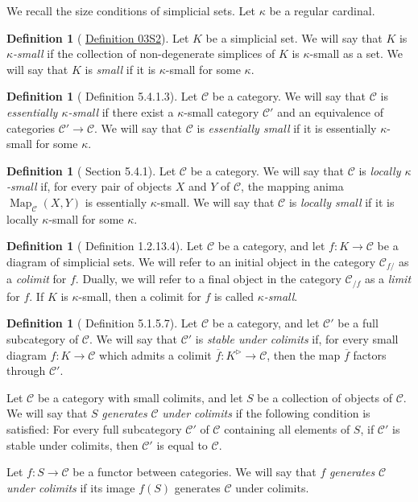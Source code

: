 \documentclass[a4paper,dvipdfmx,11pt,reqno]{amsart}
\DeclareMathOperator{\Map}{Map}
\newcommand{\C}{\mathcal{C}}
\theoremstyle{definition}
\newtheorem{definition}[theorem]{Definition}
\begin{document}
We recall the size conditions of simplicial sets.
Let $\kappa$ be a regular cardinal.

\begin{definition}[\cite{kerodon} \href{https://kerodon.net/tag/03S2}{Definition 03S2}]
  Let $K$ be a simplicial set.
  We will say that $K$ is \textit{$\kappa$-small} if the collection of non-degenerate simplices of $K$ is $\kappa$-small as a set.
  We will say that $K$ is \textit{small} if it is $\kappa$-small for some $\kappa$.
\end{definition}

\begin{definition}[\cite{HTT} Definition 5.4.1.3]
  Let $\C$ be a category.
  We will say that $\C$ is \textit{essentially $\kappa$-small} if there exist a $\kappa$-small category $\C'$ and an equivalence of categories $\C' \to \C$.
  We will say that $\C$ is \textit{essentially small} if it is essentially $\kappa$-small for some $\kappa$.
\end{definition}

\begin{definition}[\cite{HTT} Section 5.4.1]
  Let $\C$ be a category.
  We will say that $\C$ is \textit{locally $\kappa$-small} if, for every pair of objects $X$ and $Y$ of $\C$, the mapping anima $\Map_{\C}(X,Y)$ is essentially $\kappa$-small.
  We will say that $\C$ is \textit{locally small} if it is locally $\kappa$-small for some $\kappa$.
\end{definition}

\begin{definition}[\cite{HTT} Definition 1.2.13.4]
  Let $\C$ be a category, and let $f : K \to \C$ be a diagram of simplicial sets.
  We will refer to an initial object in the category $\C_{f/}$ as a \textit{colimit} for $f$.
  Dually, we will refer to a final object in the category $\C_{/f}$ as a \textit{limit} for $f$.
  If $K$ is $\kappa$-small, then a colimit for $f$ is called \textit{$\kappa$-small}.
\end{definition}

\begin{definition}[\cite{HTT} Definition 5.1.5.7]
  Let $\C$ be a category, and let $\C'$ be a full subcategory of $\C$.
  We will say that $\C'$ is \textit{stable under colimits} if, for every small diagram $f : K \to \C$ which admits a colimit $\overline{f} : K^\triangleright \to \C$, then the map $\overline{f}$ factors through $\C'$. 

  Let $\C$ be a category with small colimits, and let $S$ be a collection of objects of $\C$.
  We will say that $S$ \textit{generates} $\C$ \textit{under colimits} if the following condition is satisfied:
  For every full subcategory $\C'$ of $\C$ containing all elements of $S$, if $\C'$ is stable under colimits, then $\C'$ is equal to $\C$.

  Let $f : S \to \C$ be a functor between categories.
  We will say that $f$ \textit{generates} $\C$ \textit{under colimits} if its image $f(S)$ generates $\C$ under colimits.
\end{definition}
\end{document}
